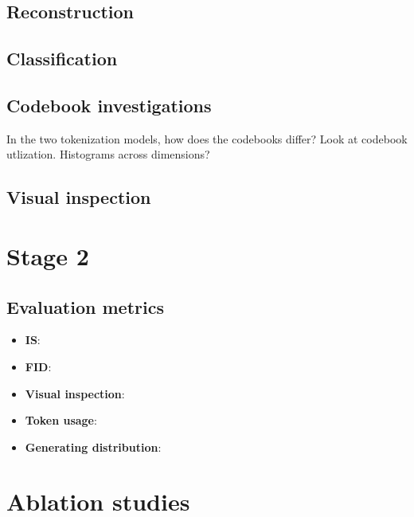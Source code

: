 \documentclass[../../thesis.tex]{subfiles}
\begin{document}
\subsection{Reconstruction}

\subsection{Classification}

\subsection{Codebook investigations}

In the two tokenization models, how does the codebooks differ? Look at codebook utlization. Histograms across dimensions?  

\subsection{Visual inspection}

\section{Stage 2}

\subsection{Evaluation metrics}

\begin{itemize}
    \item \textbf{IS}:
    \item \textbf{FID}:
    \item \textbf{Visual inspection}:
    \item \textbf{Token usage}:
    \item \textbf{Generating distribution}:
\end{itemize}


\section{Ablation studies}
\end{document}
